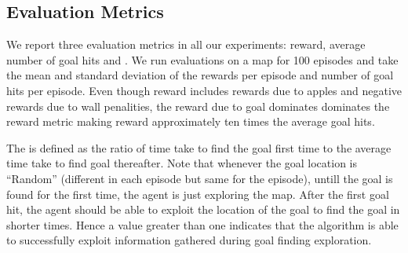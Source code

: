 \subsection{Evaluation Metrics}
We report three evaluation metrics in all our experiments: reward, average number of goal hits and \LatencyOneGtOne{}. We run evaluations on a map for 100 episodes and take the mean and standard deviation of the rewards per episode and number of goal hits per episode. Even though reward includes rewards due to apples and negative rewards due to wall penalities, the reward due to goal dominates dominates the reward metric making reward approximately ten times the average goal hits.

The \LatencyOneGtOne{} is defined as the ratio of time take to find the goal first time to the average time take to find goal thereafter.
Note that whenever the goal location is ``Random'' (different in each episode but same for the episode), untill the goal is found for the first time, the agent is just exploring the map.
After the first goal hit, the agent should be able to exploit the location of the goal to find the goal in shorter times.
Hence a \LatencyOneGtOne{} value greater than one indicates that the algorithm is able to successfully exploit information gathered during goal finding exploration.



